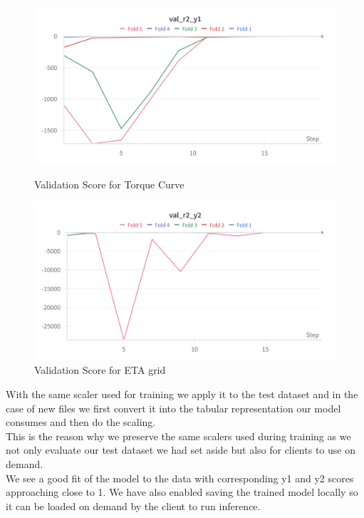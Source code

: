 \documentclass{report} %
\begin{document}
\begin{figure}[h]
    \centering
    \begin{minipage}[b]{0.3\textwidth}
        \includegraphics[width=\textwidth]{./ReportImages/val_r2_y1.png}
        \caption{Validation Score for Torque Curve}
        \label{fig:Validation Score for Torque Curve}
    \end{minipage}
    \hfill
    \begin{minipage}[b]{0.3\textwidth}
        \includegraphics[width=\textwidth]{./ReportImages/val_r2_y2.png}
        \caption{Validation Score for ETA grid}
        \label{fig:Validation Score for ETA grid}
    \end{minipage}
\end{figure}

With the same scaler used for training we apply it to the test dataset and in the case of new files we first convert it into the tabular representation our model consumes and then do the scaling.\\
This is the reason why we preserve the same scalers used during training as we not only evaluate our test dataset we had set aside but also for clients to use on demand. \\
We see a good fit of the model to the data with corresponding y1 and y2 scores approaching close to 1.
We have also enabled saving the trained model locally so it can be loaded on demand by the client to run inference.\\
\end{document}
